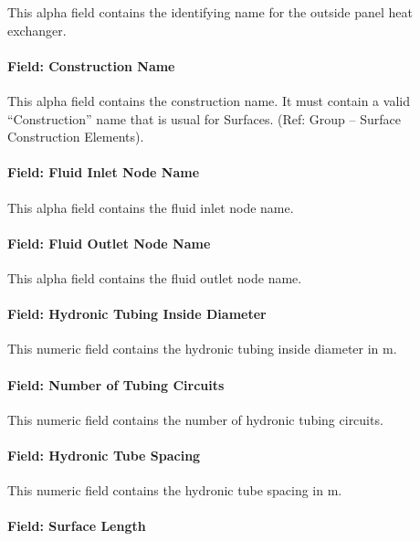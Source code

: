 This alpha field contains the identifying name for the outside panel heat exchanger.

\paragraph{Field: Construction Name}\label{field-construction-name-000}

This alpha field contains the construction name. It must contain a valid ``Construction'' name that is usual for Surfaces. (Ref: Group -- Surface Construction Elements).

\paragraph{Field: Fluid Inlet Node Name}\label{field-fluid-inlet-node-name-1}

This alpha field contains the fluid inlet node name.

\paragraph{Field: Fluid Outlet Node Name}\label{field-fluid-outlet-node-name-1}

This alpha field contains the fluid outlet node name.

\paragraph{Field: Hydronic Tubing Inside Diameter}\label{field-hydronic-tubing-inside-diameter-1}

This numeric field contains the hydronic tubing inside diameter in m.

\paragraph{Field: Number of Tubing Circuits}\label{field-number-of-tubing-circuits-1}

This numeric field contains the number of hydronic tubing circuits.

\paragraph{Field: Hydronic Tube Spacing}\label{field-hydronic-tube-spacing}

This numeric field contains the hydronic tube spacing in m.

\paragraph{Field: Surface Length}\label{field-surface-length}

